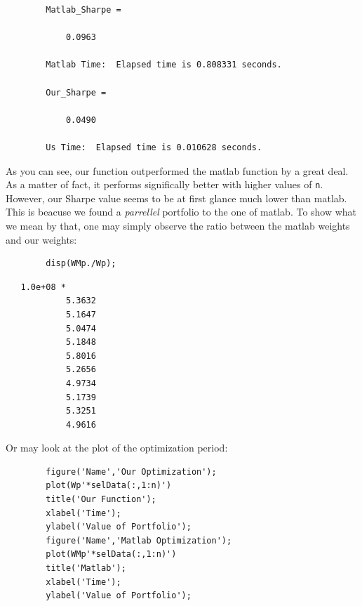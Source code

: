 \documentclass[12pt,titlepage,a4paper]{article}
\begin{document}
    \color{lightgray} \begin{verbatim}
		Matlab_Sharpe =

    		0.0963

		Matlab Time:  Elapsed time is 0.808331 seconds.

		Our_Sharpe =

		    0.0490

		Us Time:  Elapsed time is 0.010628 seconds.
	\end{verbatim} \color{black}
    \begin{par}
		As you can see, our function outperformed the matlab function by a great deal. As a matter of fact, it performs significally better with higher values of \texttt{n}. However, our Sharpe value seems to be at first glance much lower than matlab. This is beacuse we found a \textit{parrellel} portfolio to the one of matlab. To show what we mean by that, one may simply observe the ratio between the matlab weights and our weights:
	\end{par} \vspace{1em}
	\begin{verbatim}
		disp(WMp./Wp);
	\end{verbatim}
        \color{lightgray} \begin{verbatim}   1.0e+08 *
		    5.3632
		    5.1647
		    5.0474
		    5.1848
		    5.8016
		    5.2656
		    4.9734
		    5.1739
		    5.3251
		    4.9616

	\end{verbatim} \color{black}
    \begin{par}
		Or may look at the plot of the optimization period:
	\end{par} \vspace{1em}
	\begin{verbatim}
		figure('Name','Our Optimization');
		plot(Wp'*selData(:,1:n)')
		title('Our Function');
		xlabel('Time');
		ylabel('Value of Portfolio');
		figure('Name','Matlab Optimization');
		plot(WMp'*selData(:,1:n)')
		title('Matlab');
		xlabel('Time');
		ylabel('Value of Portfolio');
	\end{verbatim}
\end{document}
